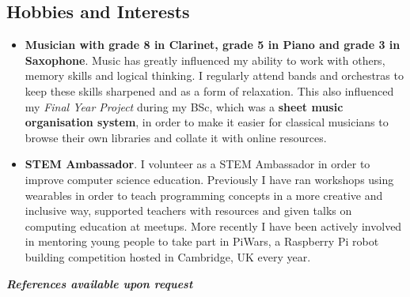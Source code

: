 \documentclass{article}
\begin{document}
\begin{flushleft}
\section*{Hobbies and Interests}
\begin{itemize}
\item \textbf{Musician with grade 8 in Clarinet, grade 5 in Piano and grade 3 in Saxophone}. Music has greatly influenced my ability to work with others, memory skills and logical thinking. I regularly attend bands and orchestras to keep these skills sharpened and as a form of relaxation. This also influenced my \textit{Final Year Project} during my BSc, which was a \textbf{sheet music organisation system}, in order to make it easier for classical musicians to browse their own libraries and collate it with online resources. 

\item \textbf{STEM Ambassador}. I volunteer as a STEM Ambassador in order to improve computer science education. Previously I have ran workshops using wearables in order to teach programming concepts in a more creative and inclusive way, supported teachers with resources and given talks on computing education at meetups. More recently I have been actively involved in mentoring young people to take part in PiWars, a Raspberry Pi robot building competition hosted in Cambridge, UK every year.\\[15pt]
\end{itemize}
\end{flushleft}

\textbf{\textit{References available upon request}}
\end{document}
